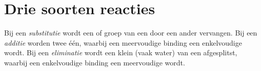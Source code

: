 \section{Drie soorten reacties}

\begin{definition}\label{def:g12:curly-arrows:categories}
Bij een \emph{substitutie} wordt een  of groep
van een  door een ander vervangen. Bij een
\emph{additie} worden twee  één, waarbij een
meervoudige binding een enkelvoudige wordt. Bij een
\emph{eliminatie} wordt een klein  (vaak water)
van een  afgesplitst, waarbij een enkelvoudige binding een
meervoudige wordt.
\end{definition}

